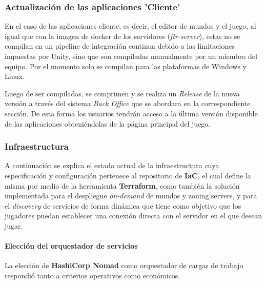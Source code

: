 \subsubsection{Actualización de las aplicaciones 'Cliente'}

En el caso de las aplicaciones cliente, es decir, el editor de mundos y el juego, al igual que con la imagen 
de docker de los servidores (\textit{ftr-server}), estas no se compilan en un pipeline de integración continua 
debido a las limitaciones impuestas por Unity, sino que son compiladas manualmente por un miembro del equipo. 
Por el momento solo se compilan para las plataformas de Windows y Linux.

\vspace{0.25cm}

Luego de ser compiladas, se comprimen y se realiza un \textit{Release} de la nueva versión a través del sistema \textit{Back Office} que se abordara en la correspondiente sección.
De esta forma los usuarios tendrán acceso a la última versión disponible de las aplicaciones obteniéndolas de la página principal del juego.

\subsubsection{Infraestructura}
\label{sec:infrastructure}

A continuación se explica el estado actual de la infraestructura cuya especificación y configuración pertenece al repositorio
de \textbf{IaC}, el cual define la misma por medio de la herramienta \textbf{Terraform}, como también la solución implementada para el despliegue
\textit{on-demand} de mundos y zoning servers, y para el \textit{discovery} de servicios de forma dinámica que tiene
como objetivo que los jugadores puedan establecer una conexión directa con el servidor en el que desean jugar.

\paragraph{Elección del orquestador de servicios}

La elección de \textbf{HashiCorp Nomad} como orquestador de cargas de trabajo respondió tanto a criterios operativos como económicos.

